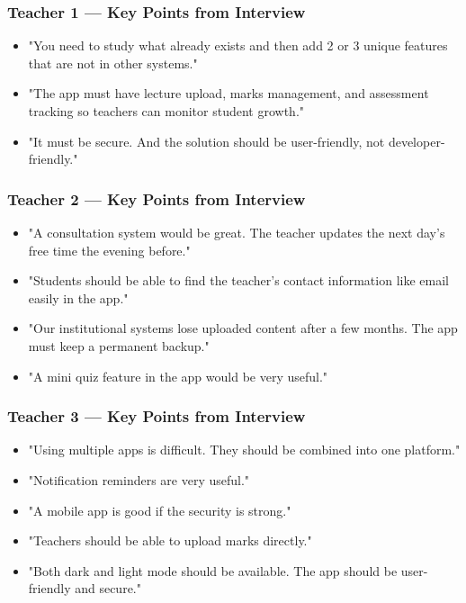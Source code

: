 \documentclass[12pt,a4paper]{article}
\begin{document}
\subsubsection{Teacher 1 --- Key Points from Interview}

\begin{tcolorbox}[quotebox]
\begin{itemize}[leftmargin=*, label=\textbullet, itemsep=4pt]
  \item "You need to study what already exists and then add 2 or 3 unique features that are not in other systems."
  \item "The app must have lecture upload, marks management, and assessment tracking so teachers can monitor student growth."
  \item "It must be secure. And the solution should be user-friendly, not developer-friendly."
\end{itemize}
\end{tcolorbox}

\subsubsection{Teacher 2 --- Key Points from Interview}

\begin{tcolorbox}[quotebox]
\begin{itemize}[leftmargin=*, label=\textbullet, itemsep=4pt]
  \item "A consultation system would be great. The teacher updates the next day's free time the evening before."
  \item "Students should be able to find the teacher's contact information like email easily in the app."
  \item "Our institutional systems lose uploaded content after a few months. The app must keep a permanent backup."
  \item "A mini quiz feature in the app would be very useful."
\end{itemize}
\end{tcolorbox}

\subsubsection{Teacher 3 --- Key Points from Interview}

\begin{tcolorbox}[quotebox]
\begin{itemize}[leftmargin=*, label=\textbullet, itemsep=4pt]
  \item "Using multiple apps is difficult. They should be combined into one platform."
  \item "Notification reminders are very useful."
  \item "A mobile app is good if the security is strong."
  \item "Teachers should be able to upload marks directly."
  \item "Both dark and light mode should be available. The app should be user-friendly and secure."
\end{itemize}
\end{tcolorbox}
\newpage
\end{document}
